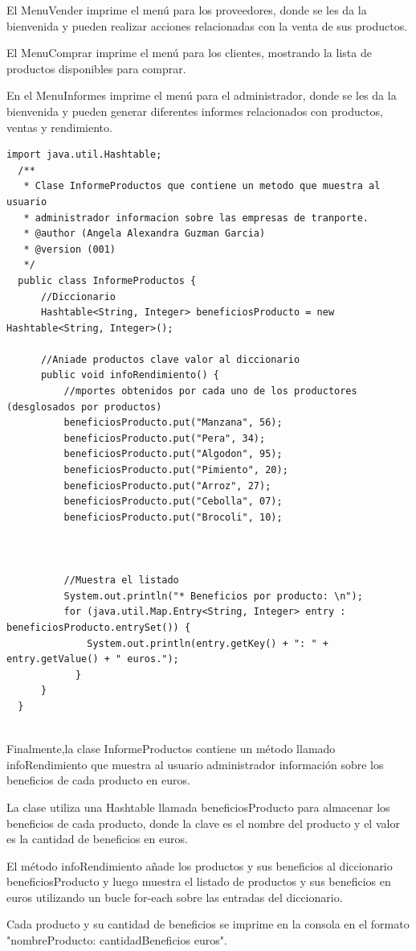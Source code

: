 \documentclass[10pt,a4paper]{article}
\def\StartLineAt#1{\lstset{firstnumber=#1}}
\begin{document}
El MenuVender imprime el menú para los proveedores, donde se les da la bienvenida y pueden realizar acciones relacionadas con la venta de sus productos.

El MenuComprar imprime el menú para los clientes, mostrando la lista de productos disponibles para comprar.

En el MenuInformes imprime el menú para el administrador, donde se les da la bienvenida y pueden generar diferentes informes relacionados con productos, ventas y rendimiento.


\StartLineAt{28}
\begin{lstlisting}[style=Java]
  import java.util.Hashtable;
  /**
   * Clase InformeProductos que contiene un metodo que muestra al usuario
   * administrador informacion sobre las empresas de tranporte.
   * @author (Angela Alexandra Guzman Garcia) 
   * @version (001)
   */
  public class InformeProductos {
      //Diccionario  
      Hashtable<String, Integer> beneficiosProducto = new Hashtable<String, Integer>();
  
      //Aniade productos clave valor al diccionario 
      public void infoRendimiento() {
          //mportes obtenidos por cada uno de los productores (desglosados por productos)
          beneficiosProducto.put("Manzana", 56);
          beneficiosProducto.put("Pera", 34);
          beneficiosProducto.put("Algodon", 95);
          beneficiosProducto.put("Pimiento", 20);
          beneficiosProducto.put("Arroz", 27);
          beneficiosProducto.put("Cebolla", 07);
          beneficiosProducto.put("Brocoli", 10);
          
      
          
          //Muestra el listado 
          System.out.println("* Beneficios por producto: \n");
          for (java.util.Map.Entry<String, Integer> entry : beneficiosProducto.entrySet()) {
              System.out.println(entry.getKey() + ": " + entry.getValue() + " euros.");
            }
      }
  }
  
\end{lstlisting}

Finalmente,la clase InformeProductos contiene un método llamado infoRendimiento que muestra al usuario administrador información sobre los beneficios de cada producto en euros.

La clase utiliza una Hashtable llamada beneficiosProducto para almacenar los beneficios de cada producto, donde la clave es el nombre del producto y el valor es la cantidad de beneficios en euros.

El método infoRendimiento añade los productos y sus beneficios al diccionario beneficiosProducto y luego muestra el listado de productos y sus beneficios en euros utilizando un bucle for-each sobre las entradas del diccionario.

Cada producto y su cantidad de beneficios se imprime en la consola en el formato "nombreProducto: cantidadBeneficios euros".






  
 
\end{document}

